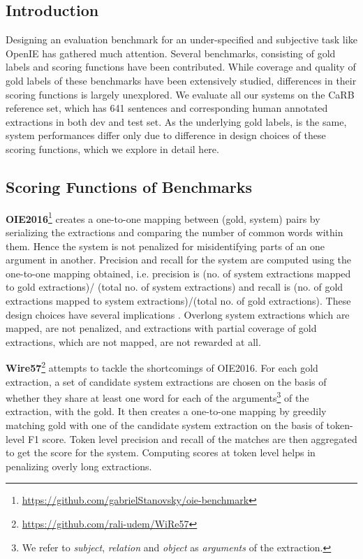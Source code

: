 \documentclass[11pt,a4paper]{article}
\begin{document}
\subsection{Introduction}

Designing an evaluation benchmark for an under-specified and subjective task like OpenIE has gathered much attention. Several benchmarks, consisting of gold labels and scoring functions have been contributed. While coverage and quality of gold labels of these benchmarks have been extensively studied, differences in their scoring functions is largely unexplored.
We evaluate all our systems on the CaRB reference set, which has 641 sentences and corresponding human annotated extractions in both dev and test set. As the underlying gold labels, is the same, system performances differ only due to difference in design choices of these scoring functions, which we explore in detail here.

\subsection{Scoring Functions of Benchmarks} \label{appendix:scoring_functions}

\textbf{OIE2016}\footnote{\url{https://github.com/gabrielStanovsky/oie-benchmark}} creates a one-to-one mapping between (gold, system) pairs by serializing the extractions and comparing the number of common words within them. Hence the system is not penalized for misidentifying parts of an one argument in another.
Precision and recall for the system are computed using the one-to-one mapping obtained, i.e. precision is (no. of system extractions mapped to gold extractions)/ (total no. of system extractions) and recall is (no. of gold extractions mapped to system extractions)/(total no. of gold extractions). These design choices have several implications \cite{william&al18, bhardwaj&al19}. Overlong system extractions which are mapped, are not penalized, and extractions with partial coverage of gold extractions, which are not mapped, are not rewarded at all.


\noindent \textbf{Wire57}\footnote{\url{https://github.com/rali-udem/WiRe57}} attempts to tackle the shortcomings of OIE2016. For each gold extraction, a set of candidate system extractions are chosen on the basis of whether they share at least one word for each of the arguments\footnote{We refer to \textit{subject}, \textit{relation} and \textit{object} as \textit{arguments} of the extraction.} of the extraction, with the gold. It then creates a one-to-one mapping by greedily matching gold with one of the candidate system extraction on the basis of token-level F1 score. Token level precision and recall of the matches are then aggregated to get the score for the system. Computing scores at token level helps in penalizing overly long extractions. 
\end{document}
